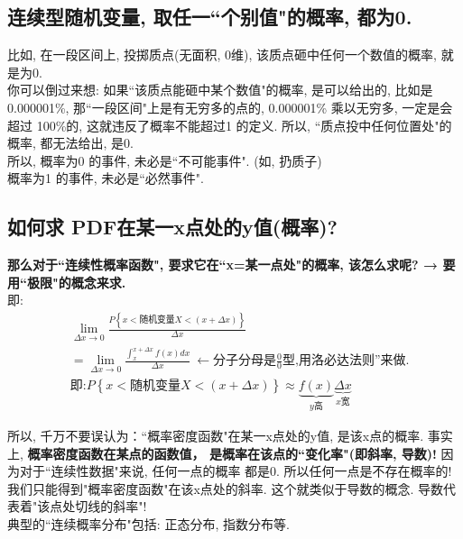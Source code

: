 \documentclass[UTF8]{ctexart}
\begin{document}
\subsection{连续型随机变量, 取任一``个别值"的概率, 都为0.}

比如, 在一段区间上, 投掷质点(无面积, 0维), 该质点砸中任何一个数值的概率, 就是为0. \\
你可以倒过来想: 如果``该质点能砸中某个数值"的概率, 是可以给出的, 比如是 0.000001\%, 那``一段区间"上是有无穷多的点的, 0.000001\% 乘以无穷多, 一定是会超过 100\%的, 这就违反了概率不能超过1 的定义. 所以, ``质点投中任何位置处"的概率, 都无法给出, 是0. \\

所以, 概率为0 的事件, 未必是``不可能事件". (如, 扔质子)  \\
概率为1 的事件, 未必是``必然事件". 




\subsection{如何求 PDF在某一x点处的y值(概率)?}


\textbf{那么对于``连续性概率函数", 要求它在``x=某一点处"的概率, 该怎么求呢?  → 要用``极限"的概念来求.} \\

即: 
\begin{align*}  %
	&\lim_{\varDelta x\rightarrow 0}\frac{P\left\{ x<\text{随机变量}X<\left( x+\varDelta x \right) \right\}}{\varDelta x}\\
&=\lim_{\varDelta x\rightarrow 0}\frac{\int_x^{x+\varDelta x}{f\left( x \right)}dx}{\varDelta x}\ \gets \text{分子分母是}\frac{0}{0}\text{型,用} \text{洛必达法则}\text{来做}.\\
&\text{即:}P\left\{ x<\text{随机变量}X<\left( x+\varDelta x \right) \right\} \approx \underset{y\text{高}}{\underbrace{f\left( x \right) }}\underset{x\text{宽}}{\underbrace{\varDelta x}}  
\end{align*}

所以, 千万不要误认为：``概率密度函数"在某一x点处的y值, 是该x点的概率. 事实上, \textbf{概率密度函数在某点的函数值， 是概率在该点的``变化率"(即斜率, 导数)!}  因为对于``连续性数据"来说, 任何一点的概率 都是0. 所以任何一点是不存在概率的! 我们只能得到"概率密度函数"在该x点处的斜率. 这个就类似于导数的概念. 导数代表着"该点处切线的斜率"! \\



典型的``连续概率分布"包括: 正态分布, 指数分布等.
\end{document}
